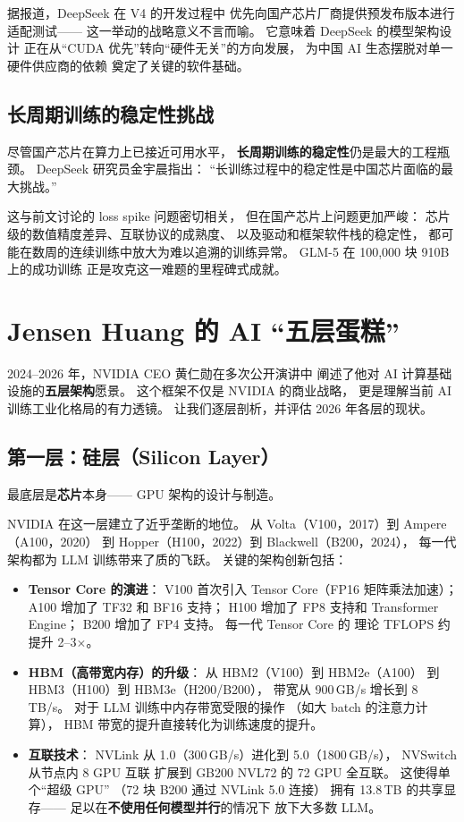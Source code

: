 据报道，DeepSeek 在 V4 的开发过程中
优先向国产芯片厂商提供预发布版本进行适配测试——
这一举动的战略意义不言而喻。
它意味着 DeepSeek 的模型架构设计
正在从``CUDA 优先''转向``硬件无关''的方向发展，
为中国 AI 生态摆脱对单一硬件供应商的依赖
奠定了关键的软件基础。

\subsection{长周期训练的稳定性挑战}

尽管国产芯片在算力上已接近可用水平，
\textbf{长周期训练的稳定性}仍是最大的工程瓶颈。
DeepSeek 研究员金宇晨指出：
``长训练过程中的稳定性是中国芯片面临的最大挑战。''

这与前文讨论的 loss spike 问题密切相关，
但在国产芯片上问题更加严峻：
芯片级的数值精度差异、互联协议的成熟度、
以及驱动和框架软件栈的稳定性，
都可能在数周的连续训练中放大为难以追溯的训练异常。
GLM-5 在 100,000 块 910B 上的成功训练
正是攻克这一难题的里程碑式成就。

\section{Jensen Huang 的 AI ``五层蛋糕''}
\label{sec:five-layers}

2024--2026 年，NVIDIA CEO 黄仁勋在多次公开演讲中
阐述了他对 AI 计算基础设施的\textbf{五层架构}愿景。
这个框架不仅是 NVIDIA 的商业战略，
更是理解当前 AI 训练工业化格局的有力透镜。
让我们逐层剖析，并评估 2026 年各层的现状。

\subsection{第一层：硅层（Silicon Layer）}

最底层是\textbf{芯片}本身——
GPU 架构的设计与制造。

NVIDIA 在这一层建立了近乎垄断的地位。
从 Volta（V100，2017）到 Ampere（A100，2020）
到 Hopper（H100，2022）到 Blackwell（B200，2024），
每一代架构都为 LLM 训练带来了质的飞跃。
关键的架构创新包括：

\begin{itemize}[noitemsep]
  \item \textbf{Tensor Core 的演进}：
        V100 首次引入 Tensor Core（FP16 矩阵乘法加速）；
        A100 增加了 TF32 和 BF16 支持；
        H100 增加了 FP8 支持和 Transformer Engine；
        B200 增加了 FP4 支持。
        每一代 Tensor Core 的
        理论 TFLOPS 约提升 2--3$\times$。
  \item \textbf{HBM（高带宽内存）的升级}：
        从 HBM2（V100）到 HBM2e（A100）
        到 HBM3（H100）到 HBM3e（H200/B200），
        带宽从 900\,GB/s 增长到 8\,TB/s。
        对于 LLM 训练中内存带宽受限的操作
        （如大 batch 的注意力计算），
        HBM 带宽的提升直接转化为训练速度的提升。
  \item \textbf{互联技术}：
        NVLink 从 1.0（300\,GB/s）进化到 5.0（1800\,GB/s），
        NVSwitch 从节点内 8 GPU 互联
        扩展到 GB200 NVL72 的 72 GPU 全互联。
        这使得单个``超级 GPU''
        （72 块 B200 通过 NVLink 5.0 连接）
        拥有 13.8\,TB 的共享显存——
        足以在\textbf{不使用任何模型并行}的情况下
        放下大多数 LLM。
\end{itemize}

